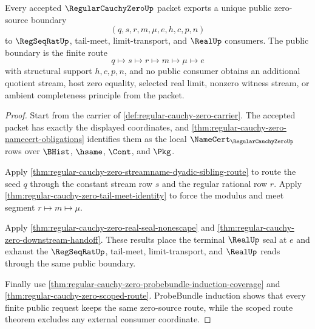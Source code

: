 \begin{theorem}
\label{thm:regular-cauchy-zero-public-zero-source-export}
Every accepted $\RegularCauchyZeroUp$ packet exports a unique public zero-source boundary
$$
(q,s,r,m,\mu,e,h,c,p,n)
$$
to $\RegSeqRatUp$, tail-meet, limit-transport, and $\RealUp$ consumers. The public boundary is the finite route
$$
q \mapsto s \mapsto r \mapsto m \mapsto \mu \mapsto e
$$
with structural support $h,c,p,n$, and no public consumer obtains an additional quotient stream, host zero equality, selected real limit, nonzero witness stream, or ambient completeness principle from the packet.
\end{theorem}
\begin{proof}
Start from the carrier of \autoref{def:regular-cauchy-zero-carrier}. The accepted packet has exactly the displayed coordinates, and \autoref{thm:regular-cauchy-zero-namecert-obligations} identifies them as the local $\NameCert_{\RegularCauchyZeroUp}$ rows over $\BHist$, $\hsame$, $\Cont$, and $\Pkg$.

Apply \autoref{thm:regular-cauchy-zero-streamname-dyadic-sibling-route} to route the seed $q$ through the constant stream row $s$ and the regular rational row $r$. Apply \autoref{thm:regular-cauchy-zero-tail-meet-identity} to force the modulus and meet segment $r \mapsto m \mapsto \mu$.

Apply \autoref{thm:regular-cauchy-zero-real-seal-nonescape} and \autoref{thm:regular-cauchy-zero-downstream-handoff}. These results place the terminal $\RealUp$ seal at $e$ and exhaust the $\RegSeqRatUp$, tail-meet, limit-transport, and $\RealUp$ reads through the same public boundary.

Finally use \autoref{thm:regular-cauchy-zero-probebundle-induction-coverage} and \autoref{thm:regular-cauchy-zero-scoped-route}. ProbeBundle induction shows that every finite public request keeps the same zero-source route, while the scoped route theorem excludes any external consumer coordinate.
\end{proof}

